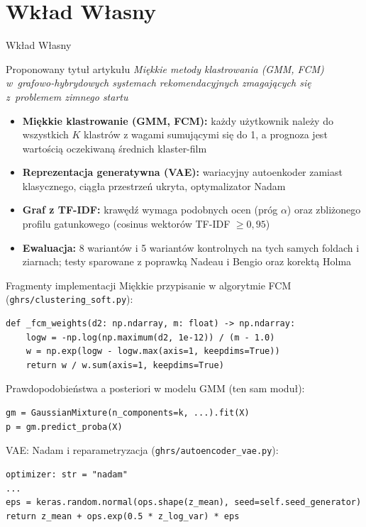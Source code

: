 \documentclass[red]{beamer}
\begin{document}
    \section{Wkład Własny}
    \begin{frame}{Wkład Własny}
        \begin{block}{Proponowany tytuł artykułu}
            \centering\itshape
            Miękkie metody klastrowania (GMM, FCM) w~grafowo-hybrydowych systemach
            rekomendacyjnych zmagających się z~problemem zimnego startu
        \end{block}
        \footnotesize
        \begin{itemize}
            \item \textbf{Miękkie klastrowanie (GMM, FCM):} każdy użytkownik należy do
                  wszystkich $K$ klastrów z wagami sumującymi się do 1, a prognoza jest
                  wartością oczekiwaną średnich klaster-film
            \item \textbf{Reprezentacja generatywna (VAE):} wariacyjny autoenkoder zamiast
                  klasycznego, ciągła przestrzeń ukryta, optymalizator Nadam
            \item \textbf{Graf z TF-IDF:} krawędź wymaga podobnych ocen (próg $\alpha$)
                  oraz zbliżonego profilu gatunkowego (cosinus wektorów TF-IDF
                  $\geq 0{,}95$)
            \item \textbf{Ewaluacja:} 8 wariantów i 5 wariantów kontrolnych na tych samych
                  foldach i ziarnach; testy sparowane z poprawką Nadeau i Bengio oraz
                  korektą Holma
        \end{itemize}
    \end{frame}

    \begin{frame}[fragile]{Fragmenty implementacji}
        \footnotesize
        Miękkie przypisanie w algorytmie FCM (\texttt{ghrs/clustering\_soft.py}):
\begin{lstlisting}
def _fcm_weights(d2: np.ndarray, m: float) -> np.ndarray:
    logw = -np.log(np.maximum(d2, 1e-12)) / (m - 1.0)
    w = np.exp(logw - logw.max(axis=1, keepdims=True))
    return w / w.sum(axis=1, keepdims=True)
\end{lstlisting}
        Prawdopodobieństwa a posteriori w modelu GMM (ten sam moduł):
\begin{lstlisting}
gm = GaussianMixture(n_components=k, ...).fit(X)
p = gm.predict_proba(X)
\end{lstlisting}
        VAE: Nadam i reparametryzacja (\texttt{ghrs/autoencoder\_vae.py}):
\begin{lstlisting}
optimizer: str = "nadam"
...
eps = keras.random.normal(ops.shape(z_mean), seed=self.seed_generator)
return z_mean + ops.exp(0.5 * z_log_var) * eps
\end{lstlisting}
    \end{frame}
\end{document}
